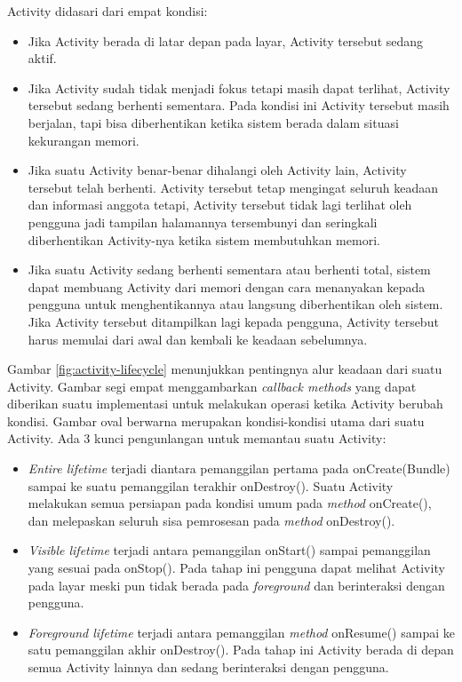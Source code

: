 Activity didasari dari empat kondisi:
\begin{itemize}
	\item Jika Activity berada di latar depan pada layar, Activity tersebut sedang aktif.
	\item Jika Activity sudah tidak menjadi fokus tetapi masih dapat terlihat, Activity tersebut sedang berhenti sementara. Pada kondisi ini Activity tersebut masih berjalan, tapi bisa diberhentikan ketika sistem berada dalam situasi kekurangan memori.
	\item Jika suatu Activity benar-benar dihalangi oleh Activity lain, Activity tersebut telah berhenti. Activity tersebut tetap mengingat seluruh keadaan dan informasi anggota tetapi, Activity tersebut tidak lagi terlihat oleh pengguna jadi tampilan halamannya tersembunyi dan seringkali diberhentikan Activity-nya ketika sistem membutuhkan memori.
	\item Jika suatu Activity sedang berhenti sementara atau berhenti total, sistem dapat membuang Activity dari memori dengan cara menanyakan kepada pengguna untuk menghentikannya atau langsung diberhentikan oleh sistem. Jika Activity tersebut ditampilkan lagi kepada pengguna, Activity tersebut harus memulai dari awal dan kembali ke keadaan sebelumnya.
\end{itemize}
Gambar \ref{fig:activity-lifecycle} menunjukkan pentingnya alur keadaan dari suatu Activity. Gambar segi empat menggambarkan \textit{callback methods} yang dapat diberikan suatu implementasi untuk melakukan operasi ketika Activity berubah kondisi. Gambar oval berwarna merupakan kondisi-kondisi utama dari suatu Activity.
Ada 3 kunci pengunlangan untuk memantau suatu Activity:
\begin{itemize}
	\item \textit{Entire lifetime} terjadi diantara pemanggilan pertama pada onCreate(Bundle) sampai ke suatu pemanggilan terakhir onDestroy(). Suatu Activity melakukan semua persiapan pada kondisi umum pada \textit{method} onCreate(), dan melepaskan seluruh sisa pemrosesan pada \textit{method} onDestroy().
	\item \textit{Visible lifetime} terjadi antara pemanggilan onStart() sampai pemanggilan yang sesuai pada onStop(). Pada tahap ini pengguna dapat melihat Activity pada layar meski pun tidak berada pada \textit{foreground} dan berinteraksi dengan pengguna.
	\item \textit{Foreground lifetime} terjadi antara pemanggilan \textit{method} onResume() sampai ke satu pemanggilan akhir onDestroy(). Pada tahap ini Activity berada di depan semua Activity lainnya dan sedang berinteraksi dengan pengguna.
\end{itemize}


